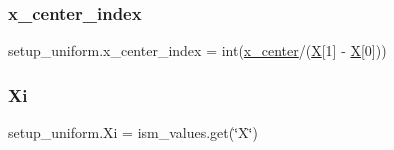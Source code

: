 \subsubsection{\texorpdfstring{x\+\_\+center\+\_\+index}{x\_center\_index}}
{\footnotesize\ttfamily setup\+\_\+uniform.\+x\+\_\+center\+\_\+index = int(\hyperlink{namespacesetup__uniform_add2270d3e0216b554470044218136714}{x\+\_\+center}/(\hyperlink{namespacesetup__uniform_a6d0e53624e475055c31146a2ff8d762c}{X}\mbox{[}1\mbox{]} -\/ \hyperlink{namespacesetup__uniform_a6d0e53624e475055c31146a2ff8d762c}{X}\mbox{[}0\mbox{]}))}

\mbox{\label{namespacesetup__uniform_acc6df1de316320aaffe7adcc4fc4c7c7}} 
\subsubsection{\texorpdfstring{Xi}{Xi}}
{\footnotesize\ttfamily setup\+\_\+uniform.\+Xi = ism\+\_\+values.\+get(\char`\"{}X\char`\"{})}

